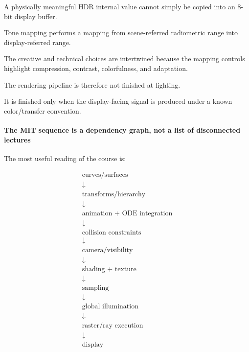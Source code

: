 A physically meaningful HDR internal value cannot simply be copied into an 8-bit display buffer.

Tone mapping performs a mapping from scene-referred radiometric range into display-referred range.

The creative and technical choices are intertwined because the mapping controls highlight compression, contrast, colorfulness, and adaptation.

The rendering pipeline is therefore not finished at lighting.

It is finished only when the display-facing signal is produced under a known color/transfer convention.

\paragraph{The MIT sequence is a dependency graph, not a list of disconnected lectures}\label{03-visual-computing-i-ch001-the-mit-sequence-is-a-dependency-graph-not-a-list-of-disconnected-lectures}

\hypertarget{03-visual-computing-i-ch001-the-mit-sequence-is-a-dependency-graph-not-a-list-of-disconnected-lectures}{}

The most useful reading of the course is:

\[
\boxed{
\begin{array}{c}
\text{curves/surfaces}\\
\downarrow\\
\text{transforms/hierarchy}\\
\downarrow\\
\text{animation + ODE integration}\\
\downarrow\\
\text{collision constraints}\\
\downarrow\\
\text{camera/visibility}\\
\downarrow\\
\text{shading + texture}\\
\downarrow\\
\text{sampling}\\
\downarrow\\
\text{global illumination}\\
\downarrow\\
\text{raster/ray execution}\\
\downarrow\\
\text{display}
\end{array}
}
\]

